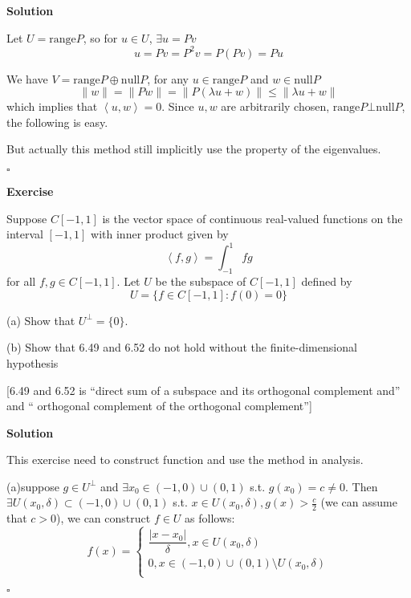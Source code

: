 \documentclass{article}
\newenvironment{exercise}{%
{\textbf{Exercise\\}
    }
}{
}
\newenvironment{solution}{%
{
    \textbf{Solution\\}
    }
}{
  \hfill $\square$ 
  \par\bigskip 
}
\newcommand{\range}{\text{range}}
\newcommand{\n}{\text{null}}
\begin{document}
\begin{CJK}{UTF8}{gkai}
\begin{solution}

    Let $U = \range P$, so for $u \in U$, $\exists u = Pv$
    \[u = Pv = P^2 v = P(Pv) = Pu \]

    We have $V = \range P \oplus \n P$, for any $u \in \range P$ and $w \in \n P$ \[\|w\| = \|Pw\| = \|P(\lambda u + w)\| \leq \|\lambda u + w\|\]
    which implies that $\left<u,w\right> = 0$. Since $u,w$ are arbitrarily chosen, $\range P \bot \n P$, the following is easy.

    But actually this method still implicitly use the property of the eigenvalues.
\end{solution}

\begin{exercise}
    Suppose $C[-1,1]$ is the vector space of continuous real-valued functions on the interval $[-1,1]$ with inner product given by
    \[\left< f, g\right> = \int_{-1}^{1}fg\]
    for all $f, g \in C[-1,1]$. Let $U$ be the subspace of $C[-1,1]$ defined by
    \[U =\{f \in C[-1,1] : f(0) = 0\}\]

    (a) Show that $U^\bot = \{0\}$.

    (b) Show that 6.49 and 6.52 do not hold without the finite-dimensional hypothesis

    [6.49 and 6.52 is ``direct sum of a subspace and its orthogonal complement and'' and `` orthogonal complement of the orthogonal complement'']
\end{exercise}

\begin{solution}
    This exercise need to construct function and use the method in analysis.

    (a)suppose $g \in U^\bot$ and $\exists x_0 \in (-1,0)\cup (0,1)$ s.t. $g(x_0) = c \neq 0$. Then $\exists U(x_0,\delta) \subset (-1,0)\cup (0,1) $ s.t. $x \in U(x_0,\delta), g(x) > \frac{c}{2}$ (we can assume that $c > 0$), we can construct $f \in U$ as follows:
    \[f(x) = \begin{cases}
        \dfrac{|x - x_0|}{\delta} , x \in U(x_0,\delta)\\
        0, x \in (-1,0)\cup (0,1) \setminus U(x_0,\delta)\\
    \end{cases}\]


\end{solution}
\end{CJK}
\end{document}
